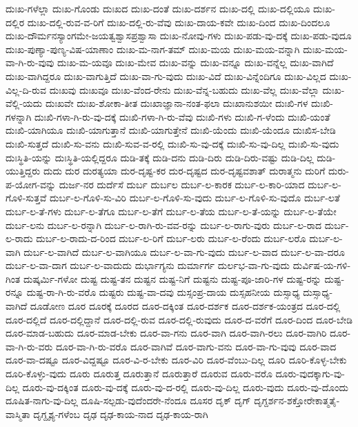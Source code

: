 {ದುಃಖ-ಗಳೆಲ್ಲಾ
ದುಃಖ-ಗೊಂಡು
ದುಃಖದ
ದುಃಖ-ದಂತೆ
ದುಃಖ-ದರ್ಶನ
ದುಃಖ-ದಲ್ಲಿ
ದುಃಖ-ದಲ್ಲಿಯೂ
ದುಃಖ-ದಲ್ಲಿರ
ದುಃಖ-ದಲ್ಲಿ-ರುವ-ವ-ರಿಗೆ
ದುಃಖ-ದಲ್ಲಿ-ರು-ವೆವು
ದುಃಖ-ದಾಯ-ಕವೇ
ದುಃಖ-ದಿಂದ
ದುಃಖ-ದಿಂದಲೂ
ದುಃಖ-ದೌರ್ಮನಸ್ಯಾಂಗಮೇ-ಜಯತ್ವಶ್ವಾಸಪ್ರಶ್ವಾಸಾ
ದುಃಖ-ನೋವು-ಗಳು
ದುಃಖ-ಪಡು-ವು-ದಕ್ಕೆ
ದುಃಖ-ಪಡು-ವುದೂ
ದುಃಖ-ಪುಣ್ಯಾ-ಪುಣ್ಯ-ವಿಷ-ಯಾಣಾಂ
ದುಃಖ-ಮ-ನಾಗ-ತಮ್
ದುಃಖ-ಮಯ
ದುಃಖ-ಮಯ-ವನ್ನಾಗಿ
ದುಃಖ-ಮಯ-ವಾ-ಗಿ-ರು-ವುವು
ದುಃಖ-ಮ-ಯವೂ
ದುಃಖ-ಮೇವ
ದುಃಖ-ವನ್ನು
ದುಃಖ-ವನ್ನೂ
ದುಃಖ-ವನ್ನೆಲ್ಲ
ದುಃಖ-ವಾಗಿದೆ
ದುಃಖ-ವಾಗಿದ್ದರೂ
ದುಃಖ-ವಾಗುತ್ತಿದೆ
ದುಃಖ-ವಾ-ಗು-ವುದು
ದುಃಖ-ವಿದೆ
ದುಃಖ-ವಿನ್ನೆಂದಿಗೂ
ದುಃಖ-ವಿಲ್ಲದ
ದುಃಖ-ವಿಲ್ಲ-ದಿ-ರುವ
ದುಃಖವು
ದುಃಖವೂ
ದುಃಖ-ವೆಂದ-ರೇನು
ದುಃಖ-ವೆನ್ನ-ಬಹುದು
ದುಃಖ-ವೆಲ್ಲ
ದುಃಖ-ವೆಲ್ಲಾ
ದುಃಖ-ವೆಲ್ಲಿ-ಯದು
ದುಃಖವೇ
ದುಃಖ-ಶೋಕಾ-ತೀತ
ದುಃಖಾಜ್ಞಾನಾ-ನಂತ-ಫಲಾ
ದುಃಖಾನುಶಯೀ
ದುಃಖಿ-ಗಳ
ದುಃಖಿ-ಗಳನ್ನಾಗಿ
ದುಃಖಿ-ಗಳಾ-ಗಿ-ರು-ವು-ದಕ್ಕೆ
ದುಃಖಿ-ಗಳಾ-ಗಿ-ರು-ವೆವು
ದುಃಖಿ-ಗಳು
ದುಃಖಿ-ಗ-ಳೆಂದು
ದುಃಖಿ-ಯಂತೆ
ದುಃಖಿ-ಯಾಗಿಯೂ
ದುಃಖಿ-ಯಾಗುತ್ತಾನೆ
ದುಃಖಿ-ಯಾಗುತ್ತೇನೆ
ದುಃಖಿ-ಯೆಂದು
ದುಃಖಿ-ಯೆಂದೂ
ದುಃಖಿಸ-ಬೇಡಿ
ದುಃಖಿ-ಸುತ್ತದೆ
ದುಃಖಿ-ಸು-ವನು
ದುಃಖಿ-ಸುವ-ವ-ರಲ್ಲಿ
ದುಃಖಿ-ಸು-ವು-ದಕ್ಕೆ
ದುಃಖಿ-ಸು-ವು-ದಿಲ್ಲ
ದುಃಖಿ-ಸು-ವುದು
ದುಃಸ್ಥಿತಿ-ಯನ್ನು
ದುಃಸ್ಥಿತಿ-ಯಲ್ಲಿದ್ದರೂ
ದುಡಿ-ತಕ್ಕೆ
ದುಡಿ-ದನು
ದುಡಿ-ದಿರು
ದುಡಿ-ದಿರು-ವಷ್ಟು
ದುಡಿ-ದಿಲ್ಲ
ದುಡಿ-ಯುತ್ತಿದ್ದರು
ದುದು
ದುರ
ದುರತ್ಯಯಾ
ದುರ-ದೃಷ್ಟ-ಕರ
ದುರ-ದೃಷ್ಟದ
ದುರ-ದೃಷ್ಟವಶಾತ್
ದುರಾತ್ಮನು
ದುರಿಗೆ
ದುರು-ಪ-ಯೋಗ-ವನ್ನು
ದುರ್ಜ-ನರ
ದುರ್ದೆಸೆ
ದುರ್ಬ
ದುರ್ಬಲ
ದುರ್ಬ-ಲ-ಕಾರಕ
ದುರ್ಬ-ಲ-ಕಾರಿ-ಯಾದ
ದುರ್ಬ-ಲ-ಗೊಳಿ-ಸುತ್ತವೆ
ದುರ್ಬ-ಲ-ಗೊಳಿ-ಸು-ವಿರಿ
ದುರ್ಬ-ಲ-ಗೊಳಿ-ಸು-ವುದು
ದುರ್ಬ-ಲ-ಗೊಳಿ-ಸು-ವುದೊ
ದುರ್ಬ-ಲತೆ
ದುರ್ಬ-ಲ-ತೆ-ಗಳು
ದುರ್ಬ-ಲ-ತೆಗೂ
ದುರ್ಬ-ಲ-ತೆಗೆ
ದುರ್ಬ-ಲ-ತೆಯ
ದುರ್ಬ-ಲ-ತೆ-ಯನ್ನು
ದುರ್ಬ-ಲ-ತೆಯೇ
ದುರ್ಬ-ಲನು
ದುರ್ಬ-ಲ-ರನ್ನಾಗಿ
ದುರ್ಬ-ಲ-ರಾಗಿ-ರು-ವವ-ರನ್ನು
ದುರ್ಬ-ಲ-ರಾಗು-ವುರು
ದುರ್ಬ-ಲ-ರಾದ
ದುರ್ಬ-ಲ-ರಾದು
ದುರ್ಬ-ಲ-ರಾದು-ದ-ರಿಂದ
ದುರ್ಬ-ಲ-ರಿಗೆ
ದುರ್ಬ-ಲರು
ದುರ್ಬ-ಲ-ರೆಂದು
ದುರ್ಬ-ಲರೊ
ದುರ್ಬ-ಲ-ವಾಗಿ
ದುರ್ಬ-ಲ-ವಾಗಿದೆ
ದುರ್ಬ-ಲ-ವಾಗಿಯೂ
ದುರ್ಬ-ಲ-ವಾ-ಗು-ವುದು
ದುರ್ಬ-ಲ-ವಾದ
ದುರ್ಬ-ಲ-ವಾ-ದರೂ
ದುರ್ಬ-ಲ-ವಾ-ದಾಗ
ದುರ್ಬ-ಲ-ವಾದುದು
ದುರ್ಭಾಗ್ಯನು
ದುರ್ಮಾರ್ಗ
ದುರ್ಲಭ-ವಾ-ಗು-ವುದು
ದುರ್ವಿಷ-ಯ-ಗಳಿ-ಗಿಂತ
ದುಷ್ಕರ್ಮಿ-ಗಳೋ
ದುಷ್ಟ
ದುಷ್ಟ-ತನ
ದುಷ್ಟನ
ದುಷ್ಟ-ನಿಗೆ
ದುಷ್ಟನು
ದುಷ್ಟ-ಪೂ-ಜಾರಿ-ಗಳ
ದುಷ್ಟ-ರನ್ನು
ದುಷ್ಟ-ರನ್ನೂ
ದುಷ್ಟ-ರಾ-ಗಿ-ರು-ವರೊ
ದುಷ್ಟರು
ದುಷ್ಟ-ವಾ-ದವು
ದುಸ್ಸಂಪ್ರ-ದಾಯ
ದುಸ್ಸಹನೀಯ
ದುಸ್ಸಾಧ್ಯ
ದುಸ್ಸಾಧ್ಯ-ವಾಗಿದೆ
ದೂಡೋಣ
ದೂರ
ದೂರಕ್ಕೆ
ದೂರದ
ದೂರ-ದಕ್ಕಿಂತ
ದೂರ-ದರ್ಶಕ
ದೂರ-ದರ್ಶಕ-ಯಂತ್ರದ
ದೂರ-ದಲ್ಲಿ
ದೂರ-ದಲ್ಲಿದೆ
ದೂರ-ದಲ್ಲಿದ್ದಾನೆ
ದೂರ-ದಲ್ಲಿ-ರುವ
ದೂರ-ದಲ್ಲಿ-ರುವುದು
ದೂರ-ದ-ವರೆಗೆ
ದೂರ-ದಿಂದ
ದೂರ-ಬೇಡಿ
ದೂರ-ಮಾಡ-ಬಹುದು
ದೂರ-ಮಾಡ-ಬೇಕು
ದೂರ-ವಾ-ಗನು
ದೂರ-ವಾಗಿ
ದೂರ-ವಾಗಿ-ರಲು
ದೂರ-ವಾಗಿರಿ
ದೂರ-ವಾ-ಗಿ-ರು-ವರು
ದೂರ-ವಾ-ಗಿ-ರು-ವರೊ
ದೂರ-ವಾಗಿವೆ
ದೂರ-ವಾಗು-ವನು
ದೂರ-ವಾ-ಗು-ವುವು
ದೂರ-ವಾದ
ದೂರ-ವಾ-ದಷ್ಟೂ
ದೂರ-ವಿದ್ದಷ್ಟೂ
ದೂರ-ವಿ-ರ-ಬೇಕು
ದೂರ-ವಿರಿ
ದೂರ-ವೆಂಬು-ದಿಲ್ಲ
ದೂರಿ
ದೂರಿ-ಕೊಳ್ಳ-ಬೇಕು
ದೂರಿ-ಕೊಳ್ಳು-ವುದು
ದೂರು
ದೂರುತ್ತ
ದೂರುತ್ತಾನೆ
ದೂರುತ್ತಾರೆ
ದೂರುವ
ದೂರು-ವರೊ
ದೂರು-ವುದಕ್ಕಾಗು-ವು-ದಿಲ್ಲ
ದೂರು-ವು-ದಕ್ಕಿಂತ
ದೂರು-ವು-ದಕ್ಕೆ
ದೂರು-ವು-ದ-ರಲ್ಲಿ
ದೂರು-ವು-ದಿಲ್ಲ
ದೂರು-ವುದು
ದೂರು-ವು-ದೊಂದು
ದೂಷಿತ-ನಾಗು-ವು-ದಿಲ್ಲ
ದೂಷಿ-ಸಲ್ಪಡು-ವುದೆಂದರೇ-ನೆಂದೂ
ದೂಸರ
ದೃಕ್
ದೃಗ್
ದೃಗ್ದರ್ಶನ-ಶಕ್ತೋರೇಕಾತ್ಮತೈ-ವಾಸ್ಮಿತಾ
ದೃಗ್ದೃಶ್ಯ-ಗಳೆಂಬ
ದೃಢ
ದೃಢ-ಕಾಯ-ನಾದ
ದೃಢ-ಕಾಯ-ರಾಗಿ
}
